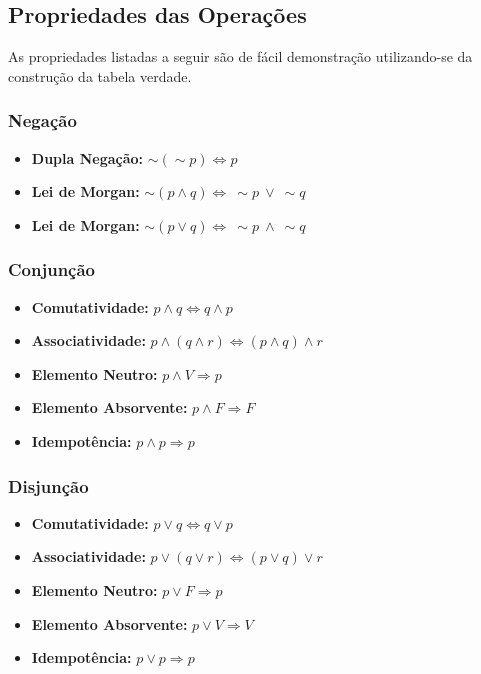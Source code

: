 \subsection*{Propriedades das Operações}
As propriedades listadas a seguir são de fácil demonstração utilizando-se da construção da tabela verdade.
\subsubsection{Negação}
\begin{itemize}
	\item \textbf{Dupla Negação:} $\sim \left( \sim p\right) \Leftrightarrow p$
	\item \textbf{Lei de Morgan:} $\sim \! \left( p \wedge q\right) \Leftrightarrow \: \sim p \: \vee \: \sim \! q$
	\item \textbf{Lei de Morgan:} $\sim \! \left( p \vee q\right) \Leftrightarrow \: \sim p \: \wedge \: \sim \! q$
\end{itemize}

\subsubsection{Conjunção}
\begin{itemize}
	\item \textbf{Comutatividade:} $p \wedge q \Leftrightarrow q \wedge p$
	\item \textbf{Associatividade:} $p \wedge \left(q \wedge r \right) \Leftrightarrow \left( p \wedge q \right) \wedge r$
	\item \textbf{Elemento Neutro:} $p \wedge V \Rightarrow p$
	\item \textbf{Elemento Absorvente:} $p \wedge F \Rightarrow F$
	\item \textbf{Idempotência:} $p \wedge p \Rightarrow p$
\end{itemize}

\subsubsection{Disjunção}
\begin{itemize}
	\item \textbf{Comutatividade:} $p \vee q \Leftrightarrow q \vee p$
	\item \textbf{Associatividade:} $p \vee \left(q \vee r \right) \Leftrightarrow \left( p \vee q \right) \vee r$
	\item \textbf{Elemento Neutro:} $p \vee F \Rightarrow p$
	\item \textbf{Elemento Absorvente:} $p \vee V \Rightarrow V$
	\item \textbf{Idempotência:} $p \vee p \Rightarrow p$
\end{itemize}


